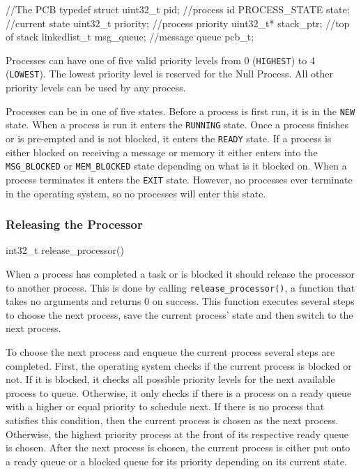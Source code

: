 \documentclass[se]{uw-wkrpt}
\begin{document}
\begin{code}
//The PCB
typedef struct {
    uint32_t pid; //process id
    PROCESS_STATE state; //current state
    uint32_t priority; //process priority
    uint32_t* stack_ptr; //top of stack
    linkedlist_t msg_queue; //message queue
} pcb_t;
\end{code}

Processes can have one of five valid priority levels from 0 (\texttt{HIGHEST}) to 4 (\texttt{LOWEST}). The lowest priority level is reserved for the Null Process. All other priority levels can be used by any process.

Processes can be in one of five states. Before a process is first run, it is in the \texttt{NEW} state. When a process is run it enters the \texttt{RUNNING} state. Once a process finishes or is pre-empted and is not blocked, it enters the \texttt{READY} state. If a process is either blocked on receiving a message or memory it either enters into the \texttt{MSG\_BLOCKED} or \texttt{MEM\_BLOCKED} state depending on what is it blocked on. When a process terminates it enters the \texttt{EXIT} state. However, no processes ever terminate in the operating system, so no processes will enter this state.

\subsubsection{Releasing the Processor}

\begin{code}
int32_t release_processor()
\end{code}

When a process has completed a task or is blocked it should release the processor to another process. This is done by calling \texttt{release\_processor()}, a function that takes no arguments and returns 0 on success. This function executes several steps to choose the next process, save the current process' state and then switch to the next process.

To choose the next process and enqueue the current process several steps are completed. First, the operating system checks if the current process is blocked or not. If it is blocked, it checks all possible priority levels for the next available process to queue. Otherwise, it only checks if there is a process on a ready queue with a higher or equal priority to schedule next. If there is no process that satisfies this condition, then the current process is chosen as the next process. Otherwise, the highest priority process at the front of its respective ready queue is chosen. After the next process is chosen, the current process is either put onto a ready queue or a blocked queue for its priority depending on its current state.
\end{document}
